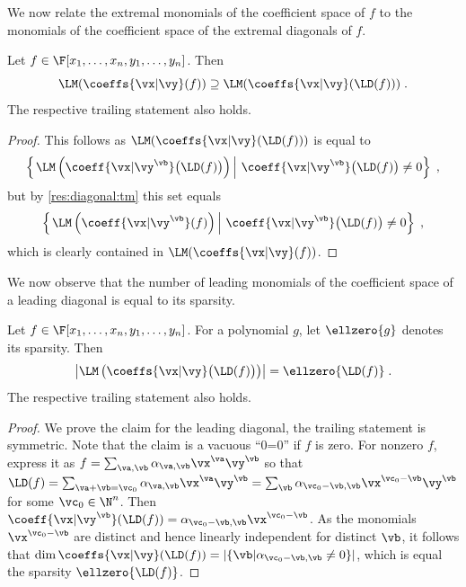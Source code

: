 \documentclass{toc}
\begin{document}
We now relate the extremal monomials of the coefficient space of $f$ to the monomials of the coefficient space of the extremal diagonals of $f$.

\begin{corollary}\label{res:diagonal:lm-coeffs}
        Let $f\in\F[x_1,\ldots,x_n,y_1,\ldots,y_n]$.  Then
        \[
                \LM(\coeffs{\vx|\vy}(f))\supseteq \LM(\coeffs{\vx|\vy}(\LD(f)))
                \;.
        \]
        The respective trailing statement also holds.
\end{corollary}
\begin{proof}
        This follows as $\LM(\coeffs{\vx|\vy}(\LD(f)))$ is equal to
        \[
                \left\{\left.\LM\left(\coeff{\vx|\vy^\vb}\big(\LD(f)\big)\right) \, \right|\,  \coeff{\vx|\vy^\vb}\big(\LD(f)\big)\ne 0\right\}
                \;,
        \]
        but by \autoref{res:diagonal:tm} this set equals
        \[
                \left\{\left.\LM\left(\coeff{\vx|\vy^\vb}(f)\right) \, \right|\,  \coeff{\vx|\vy^\vb}\big(\LD(f)\big)\ne 0\right\}
                \;,
        \]
        which is clearly contained in $\LM(\coeffs{\vx|\vy}(f))$.
\end{proof}

We now observe that the number of leading monomials of the coefficient space of a leading diagonal is equal to its sparsity.

\begin{lemma}\label{lem:LM-by-LD}
        Let $f\in\F[x_1,\ldots,x_n,y_1,\ldots,y_n]$. For a polynomial $g$, let $\ellzero{g}$ denotes its sparsity. Then
        \[
                \left|\LM\left(\coeffs{\vx|\vy}\big(\LD(f)\big)\right)\right|
                =\ellzero{\LD(f)}
                \;.
        \]
        The respective trailing statement also holds.
\end{lemma}
\begin{proof}
        We prove the claim for the leading diagonal, the trailing statement is symmetric. Note that the claim is a vacuous ``0=0'' if $f$ is zero.  For nonzero $f$, express it as $f=\sum_{\va,\vb} \alpha_{\va,\vb}\vx^\va\vy^\vb$ so that $\LD(f)=\sum_{\va+\vb=\vc_0}\alpha_{\va,\vb}\vx^\va\vy^\vb=\sum_{\vb}\alpha_{\vc_0-\vb,\vb}\vx^{\vc_0-\vb}\vy^\vb$ for some $\vc_0\in\N^n$.  Then $\coeff{\vx|\vy^\vb}(\LD(f))=\alpha_{\vc_0-\vb,\vb}\vx^{\vc_0-\vb}$.  As the monomials $\vx^{\vc_0-\vb}$ are distinct and hence linearly independent for distinct $\vb$, it follows that $\dim\coeffs{\vx|\vy}(\LD(f))=|\{\vb| \alpha_{\vc_0-\vb,\vb}\ne 0\}|$, which is equal the sparsity $\ellzero{\LD(f)}$.
\end{proof}
\end{document}
